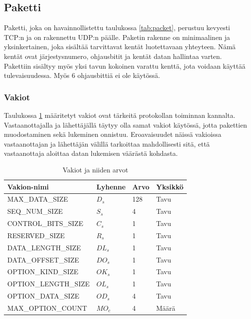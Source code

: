 \documentclass[a4paper,12pt]{article}
\begin{document}
    \subsection{Paketti}\label{sec:paketti}
    Paketti, joka on havainnollistettu taulukossa \ref{tab:packet}, perustuu kevyesti TCP:n ja on rakennettu UDP:n päälle. Paketin rakenne on minimaalinen ja yksinkertainen, joka sisältää tarvittavat kentät luotettavaan yhteyteen. Nämä kentät ovat järjestysnumero, ohjausbitit ja kentät datan hallintaa varten. Pakettiin sisältyy myös yksi tavun kokoinen varattu kenttä, jota voidaan käyttää tulevaisuudessa. Myös 6 ohjausbittiä ei ole käytössä.

    \subsubsection{Vakiot}
    Taulukossa \ref{tab:vakiot} määritetyt vakiot ovat tärkeitä protokollan toiminnan kannalta. Vastaanottajalla ja lähettäjällä täytyy olla samat vakiot käytössä, jotta pakettien muodostaminen sekä lukeminen onnistuu. Eroavaisuudet näissä vakioissa vastaanottajan ja lähettäjän välillä tarkoittaa mahdollisesti sitä, että vastaanottaja aloittaa datan lukemisen väärästä kohdasta.

    \begin{table}[h!]
        \centering
        \begin{tabular}{llll}
            Vakion-nimi          & Lyhenne & Arvo & Yksikkö \\
            \hline
            MAX\_DATA\_SIZE      & $D_s$   & 128  & Tavu    \\
            SEQ\_NUM\_SIZE       & $S_s$   & 4    & Tavu    \\
            CONTROL\_BITS\_SIZE  & $C_s$   & 1    & Tavu    \\
            RESERVED\_SIZE       & $R_s$   & 1    & Tavu    \\
            DATA\_LENGTH\_SIZE   & $DL_s$  & 1    & Tavu    \\
            DATA\_OFFSET\_SIZE   & $DO_s$  & 1    & Tavu    \\
            OPTION\_KIND\_SIZE   & $OK_s$  & 1    & Tavu    \\
            OPTION\_LENGTH\_SIZE & $OL_s$  & 1    & Tavu    \\
            OPTION\_DATA\_SIZE   & $OD_s$  & 4    & Tavu    \\
            MAX\_OPTION\_COUNT   & $MO_c$  & 4    & Määrä
        \end{tabular}
        \caption{Vakiot ja niiden arvot}
        \label{tab:vakiot}
    \end{table}
\end{document}
